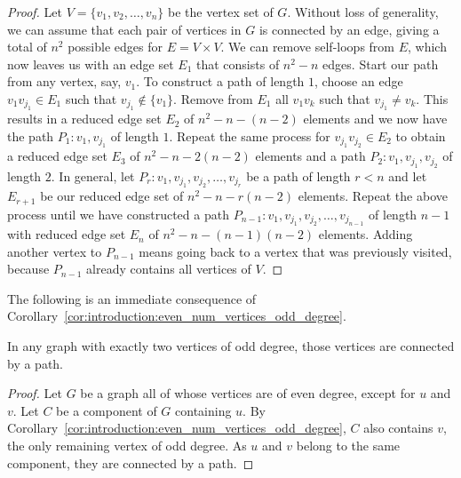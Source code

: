 \begin{proof}
Let $V = \{v_1, v_2, \dots, v_n\}$ be the vertex set of $G$. Without
loss of generality, we can assume that each pair of vertices in $G$ is
connected by an edge, giving a total of $n^2$ possible edges for
$E = V \times V$. We can remove self-loops from $E$, which now leaves
us with an edge set $E_1$ that consists of $n^2 - n$ edges. Start our
path from any vertex, say, $v_1$. To construct a path of length $1$,
choose an edge $v_1 v_{j_1} \in E_1$ such that
$v_{j_1} \notin \{v_1\}$. Remove from $E_1$ all $v_1 v_k$ such that
$v_{j_1} \neq v_k$. This results in a reduced edge set $E_2$ of
$n^2 - n - (n - 2)$ elements and we now have the path
$P_1: v_1, v_{j_1}$ of length $1$. Repeat the same process for
$v_{j_1} v_{j_2} \in E_2$ to obtain a reduced edge set $E_3$ of
$n^2 - n - 2(n - 2)$ elements and a path $P_2: v_1, v_{j_1}, v_{j_2}$
of length $2$. In general, let
$P_r: v_1, v_{j_1}, v_{j_2}, \dots, v_{j_r}$ be a path of length
$r < n$ and let $E_{r+1}$ be our reduced edge set of
$n^2 - n - r(n - 2)$ elements. Repeat the above process until we have
constructed a path
$P_{n-1}: v_1, v_{j_1}, v_{j_2}, \dots, v_{j_{n-1}}$ of length $n - 1$
with reduced edge set $E_n$ of $n^2 - n - (n - 1)(n - 2)$
elements. Adding another vertex to $P_{n-1}$ means going back to a
vertex that was previously visited, because $P_{n-1}$ already contains
all vertices of $V$.
\end{proof}

The following is an immediate consequence of
Corollary~\ref{cor:introduction:even_num_vertices_odd_degree}.

\begin{corollary}
In any graph with exactly two vertices of odd degree, those vertices
are connected by a path.
\end{corollary}

\begin{proof}
Let $G$ be a graph all of whose vertices are of even degree, except
for $u$ and $v$. Let $C$ be a component of $G$ containing $u$. By
Corollary~\ref{cor:introduction:even_num_vertices_odd_degree}, $C$
also contains $v$, the only remaining vertex of odd degree. As $u$ and
$v$ belong to the same component, they are connected by a path.
\end{proof}

